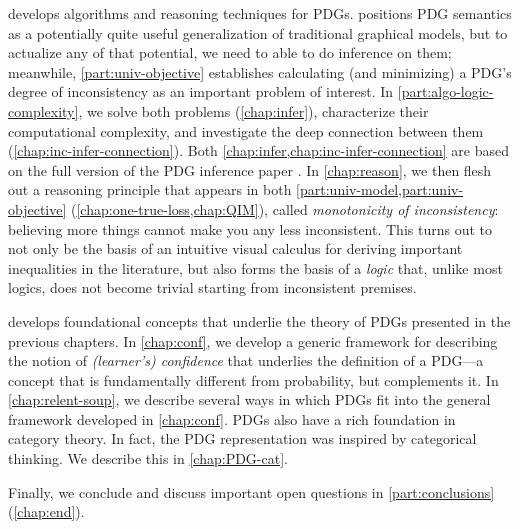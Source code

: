 \textbf{}
 develops algorithms and reasoning techniques for PDGs.
 positions PDG semantics as a potentially quite useful generalization of traditional graphical models, but to actualize any of that potential, we need to able to do inference on them;
meanwhile, 
\cref{part:univ-objective} establishes calculating (and minimizing) a PDG's degree of inconsistency as an important problem of interest. 
In \cref{part:algo-logic-complexity}, we solve both problems (\cref{chap:infer}), characterize their computational complexity, and investigate the deep connection between them (\cref{chap:inc-infer-connection}). 
Both \cref{chap:infer,chap:inc-infer-connection} are based on the full version of the PDG inference paper \citep*{pdg-infer}.
In \cref{chap:reason}, we then flesh out a
    reasoning principle that appears in both \cref{part:univ-model,part:univ-objective}
    (\cref{chap:one-true-loss,chap:QIM}),
    called \emph{monotonicity of inconsistency}: 
    believing more things cannot make you any less inconsistent. 
This turns out to not only be the basis of an intuitive visual calculus for deriving important inequalities in the literature, but also forms the basis of a \emph{logic} that, unlike most logics, does not become trivial starting from inconsistent premises.


\textbf{}
 develops foundational concepts that underlie the theory of PDGs presented in the previous chapters. 
In \cref{chap:conf}, we develop a generic framework for describing the notion of \emph{(learner's) confidence} that underlies the definition of a PDG---a concept that is fundamentally different from probability, but complements it.
In \cref{chap:relent-soup}, we describe several ways in which PDGs fit into the general framework developed in \cref{chap:conf}.
PDGs also have a rich foundation in category theory.
In fact, the PDG representation was inspired by categorical thinking. 
We describe this in \cref{chap:PDG-cat}.
%

Finally, we conclude and discuss important open questions in 
    \cref{part:conclusions}
    (\cref{chap:end}). 



